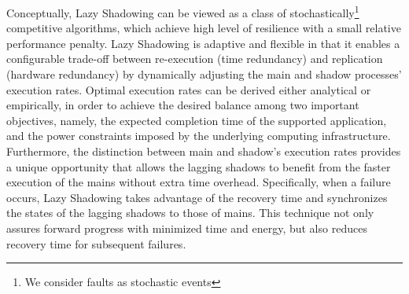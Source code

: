 Conceptually, Lazy Shadowing can be viewed as a class of stochastically\footnote{We consider faults as stochastic events} competitive algorithms, which 
achieve high level of resilience with a small relative performance penalty.
Lazy Shadowing is adaptive and flexible in that it enables a configurable trade-off between re-execution (time redundancy) and replication (hardware redundancy) by dynamically adjusting the main and shadow processes' execution rates.
Optimal execution rates can be derived either analytical or empirically, in order to achieve the desired balance among two important objectives, namely, the expected completion time of the supported application, and the power constraints imposed by the underlying computing infrastructure. %
Furthermore, the distinction between main and shadow's execution rates provides a unique opportunity %
that allows the lagging shadows to benefit from the faster execution of the mains without extra time overhead.
Specifically, when a failure occurs, Lazy Shadowing takes advantage of the recovery time and synchronizes the states of the lagging shadows to those of mains. This technique not only assures forward progress with minimized time and energy, but also reduces recovery time for subsequent failures.  


